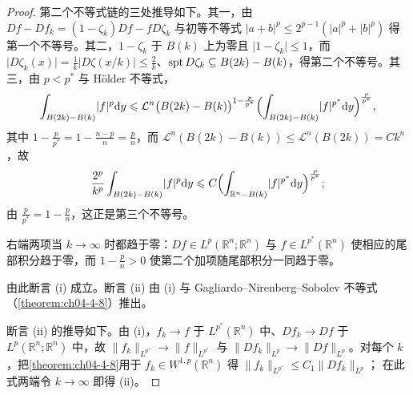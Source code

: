 \documentclass[../../main.tex]{subfiles}%
\begin{document}
\begin{proof}
第二个不等式链的三处推导如下。其一，由 $Df-Df_k=(1-\zeta_k)Df-fD\zeta_k$ 与初等不等式 $\lvert a+b\rvert^p\leqslant2^{p-1}(\lvert a\rvert^p+\lvert b\rvert^p)$ 得第一个不等号。其二，$1-\zeta_k$ 于 $B(k)$ 上为零且 $\lvert1-\zeta_k\rvert\leqslant1$，而 $\lvert D\zeta_k(x)\rvert=\frac1k\lvert D\zeta(x/k)\rvert\leqslant\frac2k$、$\operatorname{spt} D\zeta_k\subseteq B(2k)-B(k)$，得第二个不等号。其三，由 $p<p^*$ 与 Hölder 不等式，
\begin{align*}
\int_{B(2k)-B(k)}\lvert f\rvert^p\mathrm{d} y\leqslant\mathcal{L}^n\bigl(B(2k)-B(k)\bigr)^{1-\frac{p}{p^*}}\Bigl(\int_{B(2k)-B(k)}\lvert f\rvert^{p^*}\mathrm{d} y\Bigr)^{\frac{p}{p^*}},
\end{align*}
其中 $1-\frac{p}{p^*}=1-\frac{n-p}{n}=\frac pn$，而 $\mathcal{L}^n(B(2k)-B(k))\leqslant\mathcal{L}^n(B(2k))=Ck^n$，故
\begin{align*}
\frac{2^p}{k^p}\int_{B(2k)-B(k)}\lvert f\rvert^p\mathrm{d} y\leqslant C\Bigl(\int_{\mathbb{R}^n-B(k)}\lvert f\rvert^{p^*}\mathrm{d} y\Bigr)^{\frac{p}{p^*}};
\end{align*}
由 $\frac{p}{p^*}=1-\frac pn$，这正是第三个不等号。

右端两项当 $k\to\infty$ 时都趋于零：$Df\in L^p(\mathbb{R}^n;\mathbb{R}^n)$ 与 $f\in L^{p^*}(\mathbb{R}^n)$ 使相应的尾部积分趋于零，而 $1-\frac pn>0$ 使第二个加项随尾部积分一同趋于零。

由此断言 (i) 成立。断言 (ii) 由 (i) 与 Gagliardo--Nirenberg--Sobolev 不等式（\cref{theorem:ch04-4-8}）推出。%

断言 (ii) 的推导如下。由 (i)，$f_k\to f$ 于 $L^{p^*}(\mathbb{R}^n)$ 中、$Df_k\to Df$ 于 $L^p(\mathbb{R}^n;\mathbb{R}^n)$ 中，故 $\lVert f_k\rVert_{L^{p^*}}\to\lVert f\rVert_{L^{p^*}}$ 与 $\lVert Df_k\rVert_{L^p}\to\lVert Df\rVert_{L^p}$。对每个 $k$，把\cref{theorem:ch04-4-8}用于 $f_k\in W^{1,p}(\mathbb{R}^n)$ 得 $\lVert f_k\rVert_{L^{p^*}}\leqslant C_1\lVert Df_k\rVert_{L^p}$；%
在此式两端令 $k\to\infty$ 即得 (ii)。
\end{proof}
\end{document}
